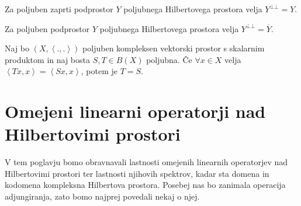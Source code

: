 \documentclass[mat2]{matdelo}
\newcommand{\Sp}[2]{\ensuremath{\left<#1, #2\right>}}
\begin{document}
		\begin{posledica}
			\label{posl:zaportoggost}
			Za poljuben zaprti podprostor $Y$ poljubnega Hilbertovega prostora velja $Y^{\bot\bot} = Y$.
		\end{posledica}
		
		\begin{posledica}
			\label{posl:ortoggost}
			Za poljuben podprostor $Y$ poljubnega Hilbertovega prostora velja $Y^{\bot\bot} = \overline{Y}$.
		\end{posledica}
		
		\begin{lema}
			\label{lem:scalprodopenak}
			Naj bo $(X, \Sp{.}{.})$ poljuben kompleksen vektorski prostor s skalarnim produktom in naj bosta $S, T \in B(X)$ poljubna. Če $\forall x\in X$ velja $\Sp{Tx}{x} = \Sp{Sx}{x}$, potem je $T = S$.
		\end{lema}
		
	\section{Omejeni linearni operatorji nad Hilbertovimi prostori}
		V tem poglavju bomo obravnavali lastnosti omejenih linearnih operatorjev nad Hilbertovimi prostori ter lastnosti njihovih spektrov, kadar sta domena in kodomena kompleksna Hilbertova prostora. Posebej nas bo zanimala operacija adjungiranja, zato bomo najprej povedali nekaj o njej.
\end{document}
